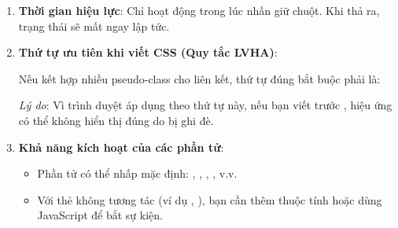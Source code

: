 \begin{warnBox}
\begin{enumerate}[leftmargin=1.5em, itemsep=3pt, parsep=0pt]
    \item \textbf{Thời gian hiệu lực}: Chỉ hoạt động trong lúc nhấn giữ chuột. Khi thả ra, trạng thái  sẽ mất ngay lập tức.
    \item \textbf{Thứ tự ưu tiên khi viết CSS (Quy tắc LVHA)}:
    \par\vspace{2pt}
    Nếu kết hợp nhiều pseudo-class cho liên kết, thứ tự đúng bắt buộc phải là:
    \par\vspace{3pt}
    \par\vspace{3pt}
    \textit{Lý do}: Vì trình duyệt áp dụng theo thứ tự này, nếu bạn viết  trước , hiệu ứng  có thể không hiển thị đúng do bị  ghi đè.
    \item \textbf{Khả năng kích hoạt của các phần tử}:
    \begin{itemize}[leftmargin=1.2em, itemsep=2pt]
        \item Phần tử có thể nhấp mặc định: , , , , v.v.
        \item Với thẻ không tương tác (ví dụ , ), bạn cần thêm thuộc tính  hoặc dùng JavaScript để bắt sự kiện.
    \end{itemize}
\end{enumerate}
\end{warnBox}

